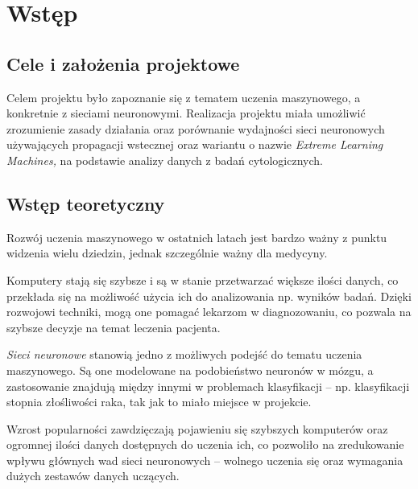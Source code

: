 \chapter{Wstęp}
\section{Cele i założenia projektowe}
Celem projektu było zapoznanie się z tematem uczenia maszynowego, a konkretnie z sieciami neuronowymi.
Realizacja projektu miała umożliwić zrozumienie zasady działania oraz porównanie wydajności sieci neuronowych używających propagacji wstecznej oraz wariantu o nazwie \textit{Extreme Learning Machines,} na podstawie analizy danych z badań cytologicznych.
\section{Wstęp teoretyczny}
Rozwój uczenia maszynowego w ostatnich latach jest bardzo ważny z punktu widzenia wielu dziedzin, jednak szczególnie ważny dla medycyny.

Komputery stają się szybsze i są w stanie przetwarzać większe ilości danych, co przekłada się na możliwość użycia ich do analizowania np. wyników badań.
Dzięki rozwojowi techniki, mogą one pomagać lekarzom w diagnozowaniu, co pozwala na szybsze decyzje na temat leczenia pacjenta.

\textit{Sieci neuronowe} stanowią jedno z możliwych podejść do tematu uczenia maszynowego.
Są one modelowane na podobieństwo neuronów w mózgu, a zastosowanie znajdują między innymi w problemach klasyfikacji -- np. klasyfikacji stopnia złośliwości raka, tak jak to miało miejsce w projekcie.

Wzrost popularności zawdzięczają pojawieniu się szybszych komputerów oraz ogromnej ilości danych dostępnych do uczenia ich, co pozwoliło na zredukowanie wpływu głównych wad sieci neuronowych -- wolnego uczenia się oraz wymagania dużych zestawów danych uczących.

